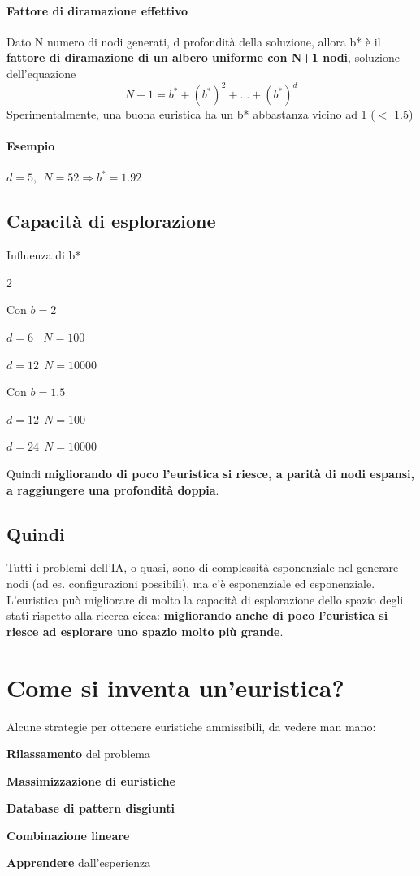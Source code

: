 \documentclass[10pt]{book}
\begin{document}
\paragraph{Fattore di diramazione effettivo} Dato N numero di nodi generati, d profondità della soluzione, allora b* è il \textbf{fattore di diramazione di un albero uniforme con N+1 nodi}, soluzione dell'equazione $$N + 1 = b^* + (b^*)^2 + \ldots + (b^*)^d$$ Sperimentalmente, una buona euristica ha un b* abbastanza vicino ad 1 ($<$ 1.5)
\paragraph{Esempio} $d = 5,\:\: N = 52 \Rightarrow b^* = 1.92$
\pagebreak
\subsection{Capacità di esplorazione} Influenza di b*
\begin{multicols}{2}
	\begin{list}{}{Con $b = 2$}
		\item $d = 6\:\:\:\:N = 100$
		\item $d = 12\:\:N = 10000$
	\end{list}
		\begin{list}{}{Con $b = 1.5$}
		\item $d = 12\:\:N = 100$
		\item $d = 24\:\:N = 10000$
	\end{list}
\end{multicols}
Quindi \textbf{migliorando di poco l'euristica si riesce, a parità di nodi espansi, a raggiungere una profondità doppia}.
\subsection*{Quindi}
Tutti i problemi dell'IA, o quasi, sono di complessità esponenziale nel generare nodi (ad es. configurazioni possibili), ma c'è esponenziale ed esponenziale. L'euristica può migliorare di molto la capacità di esplorazione dello spazio degli stati rispetto alla ricerca cieca: \textbf{migliorando anche di poco l'euristica si riesce ad esplorare uno spazio molto più grande}.
\section{Come si inventa un'euristica?}
Alcune strategie per ottenere euristiche ammissibili, da vedere man mano:
\begin{list}{}{}
	\item \textbf{Rilassamento} del problema
	\item \textbf{Massimizzazione di euristiche}
	\item \textbf{Database di pattern disgiunti}
	\item \textbf{Combinazione lineare}
	\item \textbf{Apprendere} dall'esperienza
\end{list}
\end{document}
